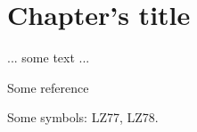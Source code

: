 \chapter{Chapter's title}
\label{sec:chapter2}

... some text ...

Some reference~\cite{Led2004}

Some symbols: LZ77\label{sym:LZ77}, LZ78\label{sym:LZ78}.

